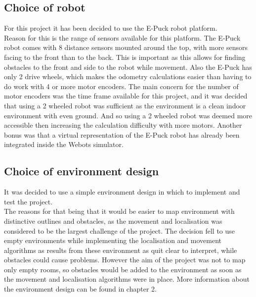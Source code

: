 \subsection{Choice of robot}
For this project it has been decided to use the E-Puck robot platform. \\
Reason for this is the range of sensors available for this platform. The E-Puck robot comes with 8 distance sensors mounted around the top, with more sensors facing to the front than to the back. This is important as this allows for finding obstacles to the front and side to the robot while movement.
Also the E-Puck has only 2 drive wheels, which makes the odometry calculations easier than having to do work with 4 or more motor encoders. The main concern for the number of motor encoders was the time frame available for this project, and it was decided that using a 2 wheeled robot was sufficient as the environment is a clean indoor environment with even ground. And so using a 2 wheeled robot was deemed more accessible then increasing the calculation difficulty with more motors. Another bonus was that a virtual representation of the E-Puck robot has already been integrated inside the Webots\textsuperscript{\texttrademark} simulator.\\

\subsection{Choice of environment design}
It was decided to use a simple environment design in which to implement and test the project.\\
The reasons for that being that it would be easier to map environment with distinctive outlines and obstacles, as the movement and localisation was considered to be the largest challenge of the project.
The decision fell to use empty environments while implementing the localisation and movement algorithms as results from these environment as quit clear to interpret, while obstacles could cause problems. However the aim of the project was not to map only empty rooms, so obstacles would be added to the environment as soon as the movement and localisation algorithms were in place. 
More information about the environment design can be found in chapter 2. 

